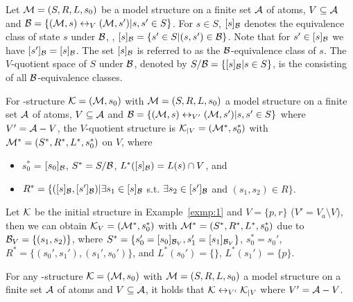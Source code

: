 \documentclass{article}
\begin{document}
Let ${\cal M}=(S, R, L,s_0)$ be a model structure on a finite set ${\cal A}$ of atoms, $V\subseteq {\cal A}$ and ${\cal B} = \{({\cal M}, s) \leftrightarrow_V ({\cal M}, s') | s, s' \in S\}$.
For $s\in S$, $[s]_{{\cal B}}$ denotes the equivalence class of state $s$ under ${\cal B}$, \ie, $[s]_{{\cal B}}=\{s' \in S| (s, s') \in {\cal B}\}$.
Note that for $s'\in [s]_{{\cal B}}$ we have $[s']_{{\cal B}} = [s]_{{\cal B}}$.
The set $[s]_{{\cal B}}$ is referred to as the ${\cal B}$-equivalence class of $s$.
The $V$-quotient space of $S$ under ${\cal B}$, denoted by $S/{\cal B}=\{[s]_{{\cal B}}| s\in S\}$, is the consisting of all ${\cal B}$-equivalence classes.
\begin{definition}
\label{def:V-quotient}
For \MPK-structure ${\cal K} = ({\cal M}, s_0)$ with ${\cal M} = (S, R, L,s_0)$ a model structure on a finite set ${\cal A}$ of atoms, $V \subseteq {\cal A}$ and ${\cal B} = \{({\cal M}, s) \leftrightarrow_{V'} ({\cal M}, s') | s, s' \in S\}$ where $V' ={\cal A}-V$, the $V$-quotient structure is ${\cal K}_{|V}=({\cal M}^*, s_0^*)$ with ${\cal M}^*=(S^*, R^*, L^*,s_0^*)$ on $V$, where
\begin{itemize}
  \item $s_0^*$ = $[s_0]_{{\cal B}}$, $S^* = S/{\cal B}$,  $L^*([s]_{{\cal B}}) = L(s) \cap V$, and
  \item $R^* = \{([s]_{{\cal B}},[s']_{{\cal B}})| \exists s_1\in [s]_{{\cal B}}$ s.t. $\exists s_2\in [s']_{{\cal B}}$ and $(s_1, s_2) \in R\}$.
\end{itemize}
\end{definition}

\begin{example}\label{exmp:VB}
Let $\cal K$ be the initial structure in Example~\ref{exmp:1} and $V=\{p,r\}$ ($V'= V_a\setminus V$), then we can obtain ${\cal K}_V=({\cal M}^*, s_0^*)$ with ${\cal M}^* =(S^*, R^*, L^*, s_0^*)$ due to ${\cal B}_V=\{(s_1,s_2)\}$, where $S^*=\{s_0'=[s_0]_{{\cal B}_V}, s_1'=[s_1]_{{\cal B}_V}\}$, $s_0^* = s_0'$, $R^*=\{(s_0',s_1'), (s_1', s_0')\}$, and $L^*(s_0') =\{\}$, $L^*(s_1') = \{p\}$. 
\end{example}

\begin{proposition}
\label{pro:VQ}
For any \MPK-structure ${\cal K} = ({\cal M}, s_0)$ with ${\cal M} = (S, R, L,s_0)$ a model structure on a finite set ${\cal A}$ of atoms and $V \subseteq {\cal A}$, it holds that ${\cal K}\leftrightarrow_{V'} {\cal K}_{|V}$ where $V'={\cal A}-V$.
\end{proposition}
\end{document}
